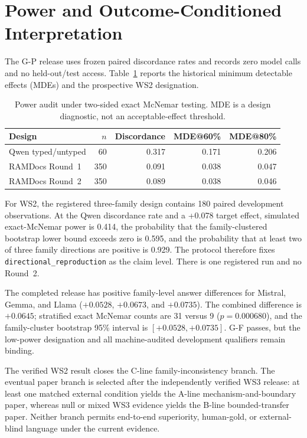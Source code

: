 \section{Power and Outcome-Conditioned Interpretation}
\label{app:power}

The G-P release uses frozen paired discordance rates and records zero model
calls and no held-out/test access. Table~\ref{tab:power} reports the historical
minimum detectable effects (MDEs) and the prospective WS2 designation.

\begin{table}[h]
\caption{Power audit under two-sided exact McNemar testing. MDE is a design
diagnostic, not an acceptable-effect threshold.}
\label{tab:power}
\begin{center}
\small
\begin{tabular}{lrrrr}
\toprule
Design & $n$ & Discordance & MDE@60\% & MDE@80\% \\
\midrule
Qwen typed/untyped & 60 & 0.317 & 0.171 & 0.206 \\
RAMDocs Round~1 & 350 & 0.091 & 0.038 & 0.047 \\
RAMDocs Round~2 & 350 & 0.089 & 0.038 & 0.046 \\
\bottomrule
\end{tabular}
\end{center}
\end{table}

For WS2, the registered three-family design contains 180 paired development
observations. At the Qwen discordance rate and a +0.078 target effect, simulated
exact-McNemar power is 0.414, the probability that the family-clustered
bootstrap lower bound exceeds zero is 0.595, and the probability that at least
two of three family directions are positive is 0.929. The protocol therefore
fixes \texttt{directional\_reproduction} as the claim level. There is one
registered run and no Round~2.

The completed release has positive family-level answer differences for
Mistral, Gemma, and Llama ($+0.0528$, $+0.0673$, and $+0.0735$). The combined
difference is $+0.0645$; stratified exact McNemar counts are 31 versus 9
($p=0.000680$), and the family-cluster bootstrap 95\% interval is
$[+0.0528,+0.0735]$. G-F passes, but the low-power designation and all
machine-audited development qualifiers remain binding.

The verified WS2 result closes the C-line family-inconsistency branch. The
eventual paper branch is selected after the independently verified WS3 release:
at least one matched external condition yields the A-line
mechanism-and-boundary paper, whereas null or mixed WS3 evidence yields the
B-line bounded-transfer paper. Neither branch permits end-to-end superiority,
human-gold, or external-blind language under the current evidence.


